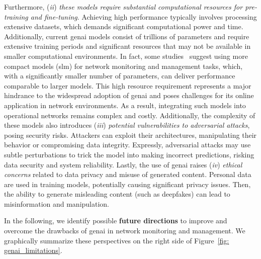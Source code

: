 %
Furthermore, (\textit{ii}) \emph{these models require substantial computational resources for pre-training and fine-tuning}. 
Achieving high performance typically involves processing extensive datasets, which demands significant computational power and time. 
%
Additionally, current \gls{genai} models consist of trillions of parameters and require extensive training periods and significant resources that may not be available in smaller computational environments.
In fact, some studies~\cite{piovesan2024telecom, erak2024leveraging} suggest using more compact models (\eg \gls{slm}) for network monitoring and management tasks, which, with a significantly smaller number of parameters, can deliver performance comparable to larger models.
%
This high resource requirement represents a major hindrance to the widespread adoption of \gls{genai} and poses challenges for its online application in network environments. 
As a result, integrating such models into operational networks remains complex and costly.
Additionally, the complexity of these models also introduces (\textit{iii}) \emph{potential vulnerabilities to adversarial attacks}, posing security risks. 
Attackers can exploit their architectures, manipulating their behavior or compromising data integrity.
Expressly, adversarial attacks may use subtle perturbations to trick the model into making incorrect predictions, risking data security and system reliability.
Lastly, the use of \gls{genai} raises (\textit{iv}) \emph{ethical concerns} related to data privacy and misuse of generated content.
Personal data are used in training models, potentially causing
significant privacy issues.
Then, the ability to generate misleading content (such as deepfakes) can lead to misinformation and manipulation.

In the following, we identify possible \textbf{future directions} to improve and overcome the drawbacks of \gls{genai} in network monitoring and management. We graphically summarize these perspectives on the right side of Figure~\ref{fig: genai_limitations}.

